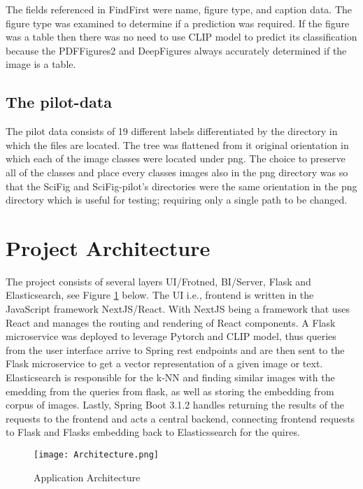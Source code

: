 \documentclass[letterpaper, 10 pt, conference]{ieeeconf}  %
\begin{document}
The fields referenced in FindFirst were name, figure type, and caption data. The figure type was examined 
to determine if a prediction was required. If the figure was a table then there was no need to use CLIP model
to predict its classification because the PDFFigures2 and DeepFigures always accurately determined if the 
image is a table. 

\subsection{The pilot-data}
The pilot data consists of 19 different labels differentiated by the directory in which the files are located.
The tree was flattened from it original orientation in which each of the image classes were located under png.
The choice to preserve all of the classes and place every classes images also in the png directory was so that 
the SciFig and SciFig-pilot's directories were the same orientation in the png directory which is useful for 
testing; requiring only a single path to be changed. 

\section{Project Architecture}
The project consists of several layers UI/Frotned, BI/Server, Flask and Elasticsearch, see Figure 
\ref{fig:architecture} below. The UI i.e., frontend is written in the JavaScript framework NextJS/React.
With NextJS being a framework that uses React and manages the routing and rendering of React components. 
A Flask microservice was deployed to leverage Pytorch and CLIP model,
thus queries from the user interface arrive to Spring rest endpoints and are then sent to the Flask 
microservice to get a vector representation of a given image or text. Elasticsearch is responsible for the 
k-NN and finding similar images with the emedding from the queries from flask, as well as storing the 
embedding from corpus of images. Lastly, Spring Boot 3.1.2 handles returning the results of the requests to 
the frontend and acts a central backend, connecting frontend requests to Flask and Flasks embedding back to 
Elasticssearch for the quires. 

\begin{figure}[h]
\texttt{[image: Architecture.png]}
\caption{Application Architecture}
\label{fig:architecture}
\end{figure}

\end{document}
